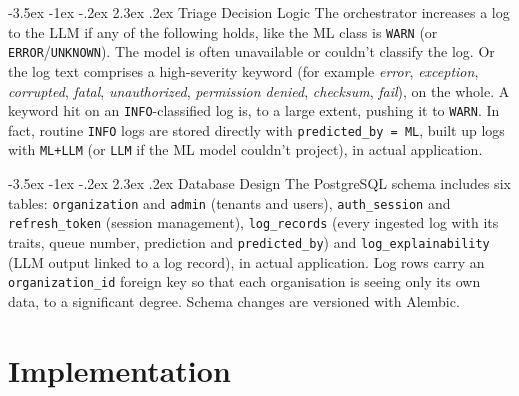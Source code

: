 \documentclass[12pt,a4paper]{report}
\makeatletter
\renewcommand\section{\@startsection {section}{1}{\z@}%
  {-3.5ex \@plus -1ex \@minus -.2ex}%
  {2.3ex \@plus .2ex}%
  {\normalfont\fontsize{17}{21}\selectfont\bfseries}}
\makeatother
\begin{document}
\section{Triage Decision Logic}
The orchestrator increases a log to the LLM if any of the following holds, like the ML class is \texttt{WARN} (or \texttt{ERROR}/\texttt{UNKNOWN}). The model is often unavailable or couldn't classify the log. Or the log text comprises a high-severity keyword (for example \emph{error}, \emph{exception}, \emph{corrupted}, \emph{fatal}, \emph{unauthorized}, \emph{permission denied}, \emph{checksum}, \emph{fail}), on the whole. A keyword hit on an \texttt{INFO}-classified log is, to a large extent, pushing it to \texttt{WARN}. In fact, routine \texttt{INFO} logs are stored directly with \texttt{predicted\_by = ML}, built up logs with \texttt{ML+LLM} (or \texttt{LLM} if the ML model couldn't project), in actual application.

\section{Database Design}
The PostgreSQL schema includes six tables: \texttt{organization} and \texttt{admin} (tenants and users), \texttt{auth\_session} and \texttt{refresh\_token} (session management), \texttt{log\_records} (every ingested log with its traits, queue number, prediction and \texttt{predicted\_by}) and \texttt{log\_explainability} (LLM output linked to a log record), in actual application. Log rows carry an \texttt{organization\_id} foreign key so that each organisation is seeing only its own data, to a significant degree. Schema changes are versioned with Alembic.

\chapter{Implementation}
\end{document}
